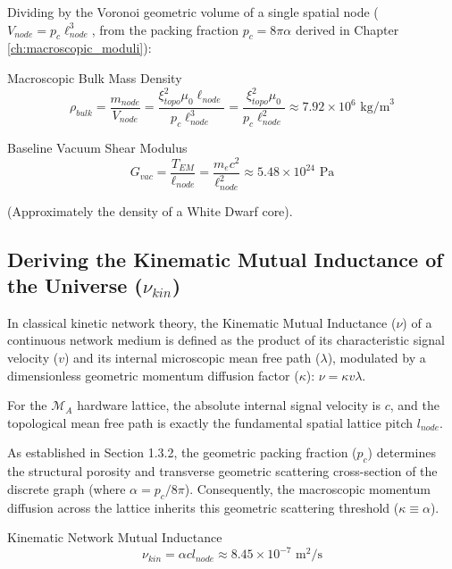 Dividing by the Voronoi geometric volume of a single spatial node ($V_{node} = p_c \ell_{node}^3$, from the packing fraction $p_c = 8\pi\alpha$ derived in Chapter \ref{ch:macroscopic_moduli}):
\begin{resultbox}{Macroscopic Bulk Mass Density}
\begin{equation}
    \rho_{bulk} = \frac{m_{node}}{V_{node}} = \frac{\xi_{topo}^2 \mu_0 \ell_{node}}{p_c \ell_{node}^3} = \frac{\xi_{topo}^2 \mu_0}{p_c \ell_{node}^2} \approx 7.92 \times 10^6 \text{ kg/m}^3
\end{equation}
\end{resultbox}
\begin{resultbox}{Baseline Vacuum Shear Modulus}
\begin{equation}
    G_{vac} = \frac{T_{EM}}{\ell_{node}} = \frac{m_e c^2}{\ell_{node}^2} \approx 5.48 \times 10^{24} \text{ Pa}
\end{equation}
\end{resultbox}
(Approximately the density of a White Dwarf core).

\subsection{Deriving the Kinematic Mutual Inductance of the Universe ($\nu_{kin}$)}

In classical kinetic network theory, the Kinematic Mutual Inductance ($\nu$) of a continuous network medium is defined as the product of its characteristic signal velocity ($v$) and its internal microscopic mean free path ($\lambda$), modulated by a dimensionless geometric momentum diffusion factor ($\kappa$): $\nu = \kappa v \lambda$.

For the $\mathcal{M}_{A}$ hardware lattice, the absolute internal signal velocity is $c$, and the topological
mean free path is exactly the fundamental spatial lattice pitch $l_{node}$. 

As established in Section 1.3.2, the geometric packing fraction ($p_c$) determines the structural porosity and transverse geometric scattering cross-section of the discrete graph (where $\alpha = p_c/8\pi$). Consequently, the macroscopic momentum diffusion across the lattice inherits this geometric scattering threshold ($\kappa \equiv \alpha$).

\begin{resultbox}{Kinematic Network Mutual Inductance}
\begin{equation}
\nu_{kin}=\alpha c l_{node}\approx8.45\times10^{-7}\text{ m}^{2}\text{/s}
\end{equation}
\end{resultbox}

